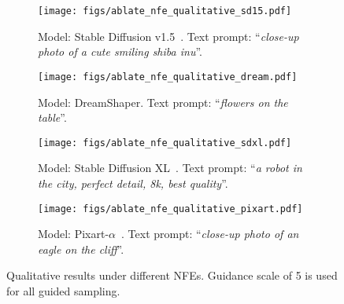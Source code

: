 \begin{figure}[t]
\begin{center}
    \begin{subfigure}[t]{0.9\textwidth}
        \texttt{[image: figs/ablate\_nfe\_qualitative\_sd15.pdf]}
        \caption{Model: Stable Diffusion v1.5~\cite{rombach2022ldm}. Text prompt: ``\textit{close-up photo of a cute smiling shiba inu}''.}
    \end{subfigure}
    \vskip 0.15in
    \begin{subfigure}[t]{0.9\textwidth}
        \texttt{[image: figs/ablate\_nfe\_qualitative\_dream.pdf]}
        \caption{Model: DreamShaper. Text prompt: ``\textit{flowers on the table}''.}
    \end{subfigure}
    \vskip 0.15in
    \begin{subfigure}[t]{0.9\textwidth}
        \texttt{[image: figs/ablate\_nfe\_qualitative\_sdxl.pdf]}
        \caption{Model: Stable Diffusion XL~\cite{podell2024sdxl}. Text prompt: ``\textit{a robot in the city, perfect detail, 8k, best quality}''.}
    \end{subfigure}
    \vskip 0.15in
    \begin{subfigure}[t]{0.9\textwidth}
        \texttt{[image: figs/ablate\_nfe\_qualitative\_pixart.pdf]}
        \caption{Model: Pixart-$\alpha$~\cite{chen2024pixart}. Text prompt: ``\textit{close-up photo of an eagle on the cliff}''.}
    \end{subfigure}
\caption{Qualitative results under different NFEs. Guidance scale of 5 is used for all guided sampling.}
\label{fig:ablate_nfe_qualitative}
\end{center}
\end{figure}


